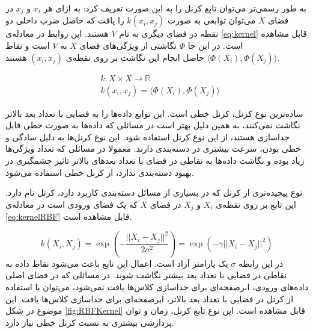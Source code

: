 به طور رسمی‌تر می‌توان تابع کرنل را به این صورت تعریف کرد: به ازای هر  $x_i$  و $x_j$ در فضای $X$ می‌توان توابعی به صورت $k(x_i,x_j)$ را یافت که حاصل ضرب داخلی دو نقطه در فضای دیگری به نام $V$ هستند. این روابط در معادله‌ی \ref{eq:kernel} قابل مشاهده است.\cite{KernelSVM} در این جا $\Phi$ نگاشتی از ویژگی‌های فضای $X$ به $V$ است و نقاط $\bigg \langle \Phi (X_i), \Phi(X_j) \bigg \rangle$ حاصل انجام این نگاشت بر روی نقطه‌ی $(x_i, x_j)$ هستند.  

\begin{equation}
\begin{split}
	& k: X \times X \to \mathbb{R} \\
	& k(x_i, x_j) = \bigg \langle \Phi (X_i), \Phi(X_j) \bigg \rangle
\end{split}
\label{eq:kernel}
\end{equation}

ساده‌ترین نوع کرنل، کرنل خطی است. این توابع  داده‌ها را به فضایی با تعداد بعد بالاتر نگاشت نمی‌کنند، به همین دلیل بهتر است در مسائلی که داده‌ها به صورت خطی قابل جداسازی هستند، از این نوع کرنل استفاده شود. 
 این نوع کرنل‌ها به دلیل سادگی و خطی بودن، سرعت بیشتری در دسته‌بندی دارند. معمولا در مسائلی که تعداد ویژگی‌ها زیاد بوده و نگاشت داده‌ها به نقاطی در فضای با تعداد بعدهای بالاتر تاثیر چشمگیری در بهبود دسته‌بندی ندارد، از کرنل خطی استفاده می‌شود. \cite{LinearSVM} 
 
 نوع پیچیده‌تری از کرنل که در بسیاری از مسائل دسته‌بندی کاربرد دارد، کرنل  نام دارد. این تابع بر روی نقطه‌ی $X_i$ و $X_j$ در فضای $X$ که یک فضای ورودی است در معادله‌ی \ref{eq:kernelRBF} قابل مشاهده است.\cite{kernelRBF}
   
\begin{equation}
	 k(X_i, X_j) = \exp(-\frac{{||X_i-X_j||}^2}{2\sigma^2}) = \exp(-\gamma{{||X_i-X_j||}^2})
\label{eq:kernelRBF}
\end{equation}
در این رابطه $\sigma$ یک پارامتر آزاد است. اعمال این تابع باعث می‌شود نقاط داده به نقاطی در فضایی با تعداد بعد بیشتر نگاشت شوند. در مسائلی که در فضای اصلی داده‌های ورودی، ابرصفحه‌ای برای جداسازی کلاس‌ها یافت نمی‌شود، می‌توان با استفاده از کرنل  در فضایی با تعداد بعد بالاتر، ابرصفحه‌ای برای جداسازی کلاس‌ها یافت. این موضوع در شکل \ref{fig:RBFKernel} قابل مشاهده است. این نوع تابع کرنل، زمان و توان پردازشی بیشتری به نسبت کرنل خطی نیاز دارد.

